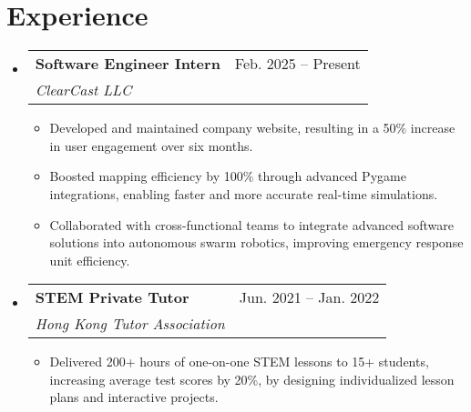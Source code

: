 \documentclass[letterpaper,11pt]{article}
\makeatletter
\newcommand{\resumeItem}[1]{
  \item\small{#1 \vspace{-2pt}}
}
\newcommand{\resumeSubheading}[4]{
  \vspace{-2pt}\item
    \begin{tabular*}{0.97\textwidth}[t]{l@{\extracolsep{\fill}}r}
      \textbf{#1} & #2 \\
      \textit{\small #3} & \textit{\small #4} \\
    \end{tabular*}\vspace{-7pt}
}
\newcommand{\resumeSubHeadingListStart}{\begin{itemize}[leftmargin=0.15in, label={}]}
\newcommand{\resumeSubHeadingListEnd}{\end{itemize}}
\newcommand{\resumeItemListStart}{\begin{itemize}}
\newcommand{\resumeItemListEnd}{\end{itemize}\vspace{-5pt}}
\makeatother
\begin{document}
\section{Experience}
\resumeSubHeadingListStart
    \resumeSubheading
      {Software Engineer Intern}{Feb. 2025 -- Present}
      {ClearCast LLC}{}
    \resumeItemListStart
        \resumeItem{Developed and maintained company website, resulting in a 50\% increase in user engagement over six months.}
        \resumeItem{Boosted mapping efficiency by 100\% through advanced Pygame integrations, enabling faster and more accurate real-time simulations.}
        \resumeItem{Collaborated with cross-functional teams to integrate advanced software solutions into autonomous swarm robotics, improving emergency response unit efficiency.}        
    \resumeItemListEnd
    \resumeSubheading
      {STEM Private Tutor}{Jun. 2021 -- Jan. 2022}
      {Hong Kong Tutor Association}{}
    \resumeItemListStart
        \resumeItem{Delivered 200+ hours of one-on-one STEM lessons to 15+ students, increasing average test scores by 20\%, by designing individualized lesson plans and interactive projects.}
    \resumeItemListEnd

\resumeSubHeadingListEnd
\end{document}
